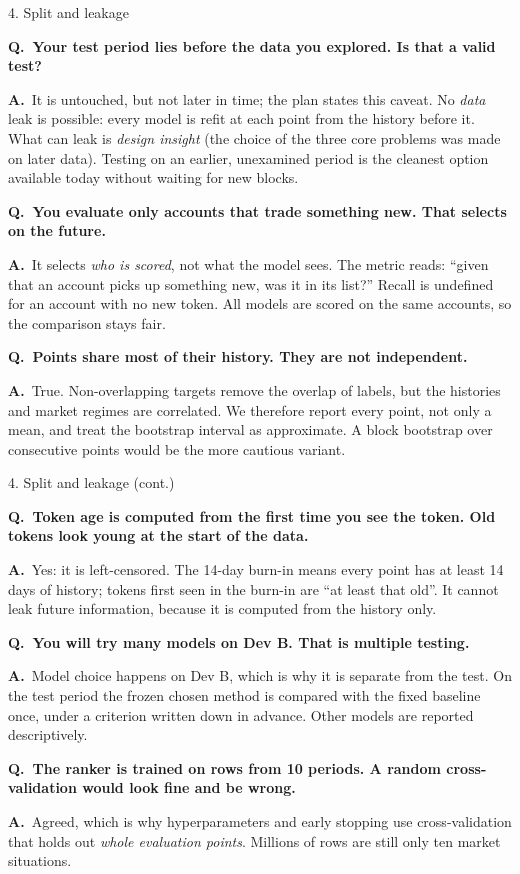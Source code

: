 \documentclass[aspectratio=169,10pt]{beamer}
\newcommand{\Q}[1]{\par{\color{orange}\bfseries Q.\ #1}\par\smallskip}
\newcommand{\A}{{\color{teal}\bfseries A.}\ }
\newcommand{\toindex}{\hfill\hyperlink{index}{\beamerreturnbutton{index}}}
\newcommand{\qsep}{\par\medskip{\color{grey!40}\hrule}\medskip}
\begin{document}
\begin{frame}[label=qsplit]{4. Split and leakage \toindex}
  \footnotesize
  \Q{Your test period lies before the data you explored. Is that a valid test?}
  \A It is untouched, but not later in time; the plan states this caveat. No \emph{data} leak is possible: every model is refit at each point from the history before it. What can leak is \emph{design insight} (the choice of the three core problems was made on later data). Testing on an earlier, unexamined period is the cleanest option available today without waiting for new blocks.
  \qsep
  \Q{You evaluate only accounts that trade something new. That selects on the future.}
  \A It selects \emph{who is scored}, not what the model sees. The metric reads: ``given that an account picks up something new, was it in its list?'' Recall is undefined for an account with no new token. All models are scored on the same accounts, so the comparison stays fair.
  \qsep
  \Q{Points share most of their history. They are not independent.}
  \A True. Non-overlapping targets remove the overlap of labels, but the histories and market regimes are correlated. We therefore report every point, not only a mean, and treat the bootstrap interval as approximate. A block bootstrap over consecutive points \cite{kunsch1989} would be the more cautious variant.
\end{frame}

\begin{frame}{4. Split and leakage (cont.) \toindex}
  \footnotesize
  \Q{Token age is computed from the first time you see the token. Old tokens look young at the start of the data.}
  \A Yes: it is left-censored. The 14-day burn-in means every point has at least 14 days of history; tokens first seen in the burn-in are ``at least that old''. It cannot leak future information, because it is computed from the history only.
  \qsep
  \Q{You will try many models on Dev B. That is multiple testing.}
  \A Model choice happens on Dev B, which is why it is separate from the test. On the test period the frozen chosen method is compared with the fixed baseline once, under a criterion written down in advance. Other models are reported descriptively.
  \qsep
  \Q{The ranker is trained on rows from 10 periods. A random cross-validation would look fine and be wrong.}
  \A Agreed, which is why hyperparameters and early stopping use cross-validation that holds out \emph{whole evaluation points}. Millions of rows are still only ten market situations.
\end{frame}
\end{document}
